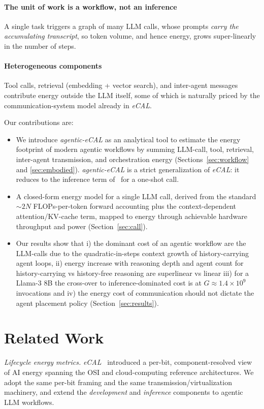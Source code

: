 \documentclass[journal]{IEEEtran}
\newcommand{\crossoverG}{\ensuremath{1.4\times10^{9}}}    %
\newcommand{\agecal}{\textit{agentic-eCAL}}
\newcommand{\ecal}{\textit{eCAL}}
\begin{document}
\paragraph{The unit of work is a workflow, not an inference} A single task triggers a graph of
  many LLM calls, whose prompts \emph{carry the accumulating transcript}, so token volume, and
  hence energy, grows super-linearly in the number of steps.

\paragraph{Heterogeneous components} Tool calls, retrieval (embedding + vector search), and
  inter-agent messages contribute energy outside the LLM itself, some of which is naturally priced
  by the communication-system model already in \ecal{}.

Our contributions are:
\begin{itemize}
\item We introduce \agecal{} as an analytical tool to estimate the energy footprint of modern agentic workflows  by summing LLM-call, tool, retrieval, inter-agent
  transmission, and orchestration energy 
(Sections~\ref{sec:workflow} and \ref{sec:embodied}). \agecal{} is a strict generalization of \ecal{}: it reduces to the inference term of~\cite{chou2026ecal} for a one-shot call.
  
  \item A closed-form energy model for a single LLM call, derived from the standard $\sim\!2N$
  FLOPs-per-token forward accounting plus the context-dependent attention/KV-cache term, mapped to
  energy through achievable hardware throughput and power (Section~\ref{sec:call}).
  
  \item Our results show that i) the dominant cost of an  agentic workflow are the LLM-calls due to the quadratic-in-steps context growth of
  history-carrying agent loops, ii) energy increase with reasoning depth and agent count for history-carrying vs history-free reasoning are superlinear vs linear iii) for a Llama-3 8B the cross-over to inference-dominated cost is at $G\approx\crossoverG$ invocations and iv) the energy cost of communication should not dictate the agent placement policy (Section~\ref{sec:results}).
\end{itemize}

\section{Related Work}\label{sec:related}
\textit{Lifecycle energy metrics.} \ecal{}~\cite{chou2026ecal} introduced a per-bit,
component-resolved view of AI energy spanning the OSI and cloud-computing reference architectures.
We adopt the same per-bit framing and the same transmission/virtualization machinery, and extend the
\emph{development} and \emph{inference} components to agentic LLM workflows.
\end{document}
